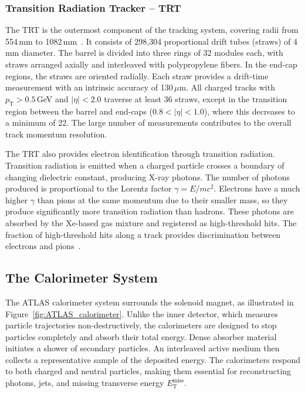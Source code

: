 \subsubsection{Transition Radiation Tracker -- TRT}

The TRT is the outermost component of the tracking system, covering radii from 554\,mm to 1082\,mm~\cite{atlas}.
It consists of 298,304 proportional drift tubes (straws) of 4\,mm diameter. 
The barrel is divided into three rings of 32 modules each, with straws arranged axially and interleaved with polypropylene fibers. 
In the end-cap regions, the straws are oriented radially. 
Each straw provides a drift-time measurement with an intrinsic accuracy of 130\,$\mu$m. 
All charged tracks with $p_{\text{T}} > 0.5$\,GeV and $|\eta| < 2.0$ traverse at least 36 straws, except in the transition region between the barrel and end-caps ($0.8 < |\eta| < 1.0$), where this decreases to a minimum of 22. 
The large number of measurements contributes to the overall track momentum resolution.

The TRT also provides electron identification through transition radiation. 
Transition radiation is emitted when a charged particle crosses a boundary of changing dielectric constant, producing X-ray photons. 
The number of photons produced is proportional to the Lorentz factor $\gamma = E/mc^2$. 
Electrons have a much higher $\gamma$ than pions at the same momentum due to their smaller mass, so they produce significantly more transition radiation than hadrons. 
These photons are absorbed by the Xe-based gas mixture and registered as high-threshold hits. 
The fraction of high-threshold hits along a track provides discrimination between electrons and pions~\cite{atlas}.

\subsection{The Calorimeter System}

The ATLAS calorimeter system surrounds the solenoid magnet, as illustrated in Figure~\ref{fig:ATLAS_calorimeter}. 
Unlike the inner detector, which measures particle trajectories non-destructively, the calorimeters are designed to stop particles completely and absorb their total energy. 
Dense absorber material initiates a shower of secondary particles. 
An interleaved active medium then collects a representative sample of the deposited energy. 
The calorimeters respond to both charged and neutral particles, making them essential for reconstructing photons, jets, and missing transverse energy $E_{\text{T}}^{\text{miss}}$.

